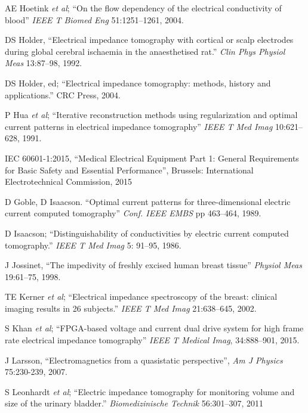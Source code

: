 \documentclass[12pt]{article} \usepackage[margin=3cm]{geometry} \usepackage[margin=20pt,font=small,labelfont=bf]{caption}\def\TBLWIDA{35mm}\def\TBLWIDB{95mm}
\newcommand{\ifmaxthree}[2]{#2 {\em et al}; }
\begin{document}
\begin{thebibliography}{00}
\ifmaxthree{
AE Hoetink, TJ Faes, KR Visser, RM Heethaar,
}{
AE Hoetink
}
``On the flow dependency of the electrical conductivity of blood''
{\em  IEEE T Biomed Eng} 51:1251--1261, 2004.

DS Holder,
``Electrical impedance tomography with cortical or scalp electrodes during global cerebral ischaemia in the anaesthetised rat.''
{\em Clin Phys Physiol Meas} 13:87--98, 1992. %

DS Holder, ed;
``Electrical impedance tomography: methods, history and applications.''
CRC Press, 2004.


\ifmaxthree{
P Hua, EJ Woo, JG Webster,  WJ Tompkins,
}{
P Hua
}
``Iterative reconstruction methods using regularization and optimal current patterns in electrical impedance tomography''
{\em  IEEE T Med Imag} 10:621--628, 1991.

IEC 60601-1:2015,
 ``Medical Electrical Equipment Part 1:  General Requirements for
Basic Safety and Essential Performance'',
Brussels: International Electrotechnical Commission, 2015

D Goble, D Isaacson.
``Optimal current patterns for three-dimensional electric current computed tomography''
{\em Conf. IEEE EMBS} pp 463--464, 1989.

D Isaacson;
``Distinguishability of conductivities by electric current computed tomography.''
{\em IEEE T Med Imag} 5: 91--95, 1986.

J Jossinet,
``The impedivity of freshly excised human breast tissue''
{\em Physiol Meas} 19:61--75, 1998.

\ifmaxthree{
TE Kerner, KD Paulsen, A Hartov, SK Soho, SP Poplack,
}{
TE Kerner
}
``Electrical impedance spectroscopy of the breast: clinical imaging results in 26 subjects.''
{\em  IEEE T Med Imag} 21:638--645, 2002.

\ifmaxthree{
S Khan, P Manwaring, A Borsic, R Halter, 
}{
S Khan
}
``FPGA-based voltage and current dual drive system for high frame rate electrical impedance tomography''
{\em IEEE T Medical Imag}, 34:888--901, 2015.

J Larsson,
``Electromagnetics from a quasistatic perspective'',
{\em Am J Physics} 75:230-239, 2007.

\ifmaxthree{
S Leonhardt, A Cordes, H Plewa, R Pikkemaat, I Soljanik, K Moehring, HJ Gerner, R Rupp,
}{
S Leonhardt
}
``Electric impedance tomography for monitoring volume and size of the urinary bladder.''
{\em Biomedizinische Technik} 56:301--307, 2011


\end{thebibliography}
\end{document}
